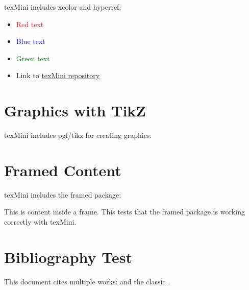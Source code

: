 \documentclass[11pt]{article}
\begin{document}
texMini includes xcolor and hyperref:

\begin{itemize}
    \item \textcolor{red}{Red text}
    \item \textcolor{blue}{Blue text}
    \item \textcolor{green}{Green text}
    \item Link to \href{https://github.com/alexmill/texMini}{texMini repository}
\end{itemize}

\section{Graphics with TikZ}

texMini includes pgf/tikz for creating graphics:

\begin{center}
\end{center}

\section{Framed Content}

texMini includes the framed package:

\begin{framed}
This is content inside a frame. This tests that the framed package is working correctly with texMini.
\end{framed}

\section{Bibliography Test}

This document cites multiple works: \cite{testwork2024} and the classic \cite{knuth1984texbook}.
\end{document}
